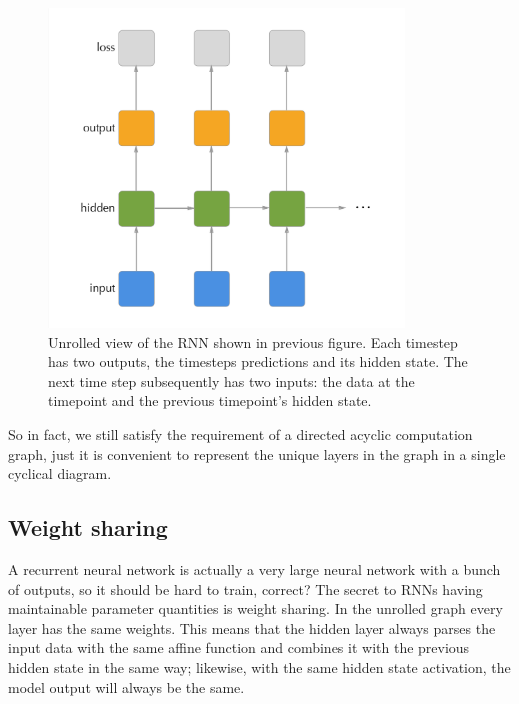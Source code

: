 \documentclass[]{book}
\theoremstyle{definition}
\theoremstyle{definition}
\theoremstyle{definition}
\theoremstyle{remark}
\begin{document}
\begin{figure}
\includegraphics[height=320]{figures/rnn_unrolled} \caption{Unrolled view of the RNN shown in previous figure. Each timestep has two outputs, the timesteps predictions and its hidden state. The next time step subsequently has two inputs: the data at the timepoint and the previous timepoint's hidden state.}\label{fig:unrolledgraph}
\end{figure}

So in fact, we still satisfy the requirement of a directed acyclic
computation graph, just it is convenient to represent the unique layers
in the graph in a single cyclical diagram.

\subsection{Weight sharing}\label{weight-sharing}

A recurrent neural network is actually a very large neural network with
a bunch of outputs, so it should be hard to train, correct? The secret
to RNNs having maintainable parameter quantities is weight sharing. In
the unrolled graph every layer has the same weights. This means that the
hidden layer always parses the input data with the same affine function
and combines it with the previous hidden state in the same way;
likewise, with the same hidden state activation, the model output will
always be the same.
\end{document}
